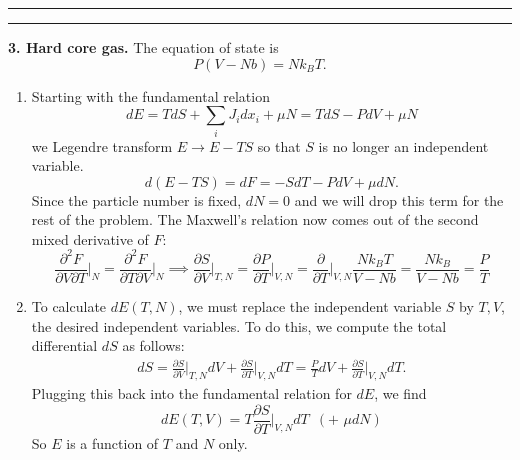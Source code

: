 \documentclass{article}
\theoremstyle{definition}
\newcommand{\p}{\partial}
\newcommand{\f}[2]{\frac{#1}{#2}}
\begin{document}
\hrule
\hrule

$\,$\\


\noindent \textbf{3. Hard core gas.} The equation of state is 
\begin{equation*}
P(V-Nb) = Nk_B T.
\end{equation*}

\begin{enumerate}[label=(\alph*)]
	\item Starting with the fundamental relation
	\begin{equation*}
	dE = TdS + \sum_i J_i dx_i + \mu N = TdS - PdV + \mu N
	\end{equation*}
	we Legendre transform $E \to E - TS$ so that $S$ is no longer an independent variable. 
	\begin{equation*}
	d(E-TS) = dF = -SdT -PdV + \mu dN.
	\end{equation*}
	Since the particle number is fixed, $dN=0$ and we will drop this term for the rest of the problem. The Maxwell's relation now comes out of the second mixed derivative of $F$:
	\begin{equation*}
	\f{\p^2 F}{\p V \p T}\bigg\vert_{N} = \f{\p^2 F}{\p T \p V}\bigg\vert_{N} \implies \boxed{\f{\p S}{\p V}\bigg\vert_{T,N}} = \f{\p P}{\p T}\bigg\vert_{V,N} = \f{\p}{\p T}\bigg\vert_{V,N} \f{Nk_BT}{V-Nb} = \f{Nk_B}{V-Nb} = \boxed{\f{P}{T}}
	\end{equation*}
	
	
	\item To calculate $dE(T,N)$, we must replace the independent variable $S$ by $T,V$, the desired independent variables. To do this, we compute the total differential $dS$ as follows:
	\begin{align*}
	dS = \f{\p S}{\p V}\bigg\vert_{T,N} dV + \f{\p S}{\p T}\bigg\vert_{V,N} dT = \f{P}{T}dV + \f{\p S}{\p T}\bigg\vert_{V,N} dT.
	\end{align*}
	Plugging this back into the fundamental relation for $dE$, we find 
	\begin{equation*}
	\boxed{dE(T,V) = T \f{\p S}{\p T}\bigg\vert_{V,N}dT \,\,\,(+ \,\,\mu dN)}
	\end{equation*}
	So $E$ is a function of $T$ and $N$ only. 
	

\end{enumerate}
\end{document}
